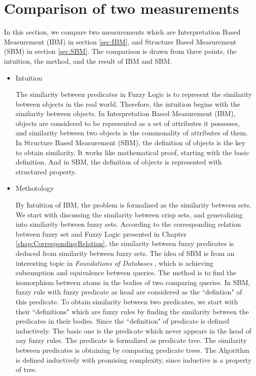 \section{Comparison of two measurements}
\label{sec:CompTwoMeasurements}
In this section, we compare two measurements which are Interpretation Based Measurement (IBM) in section \ref{sec:IBM}, and  Structure Based Measurement (SBM) in section \ref{sec:SBM}. The comparison is drawn from three points, the intuition, the method, and the result of IBM and SBM.

\begin{itemize}
\item Intuition 

The similarity between predicates in Fuzzy Logic is to represent the similarity between objects in the real world. Therefore, the intuition begins with  the similarity between objects. In Interpretation Based Measurement (IBM), objects are considered to be represented as a set of attributes it possesses, and similarity between two objects is the commonality of attributes of them. In Structure Based Measurement (SBM), the definition of objects is the key to obtain similarity. It works like mathematical proof, starting with the basic definition. And in SBM, the definition of objects  is represented with structured property.

\item Methotology

By Intuition of IBM, the problem is formalized as the similarity between sets. We start with discussing the similarity between crisp sets, and generalizing into similarity between fuzzy sets. According to the corresponding relation between fuzzy set and Fuzzy Logic presented in Chapter \ref{chap:CorrespondingRelation}, the similarity between fuzzy predicates is deduced from similarity between fuzzy sets. The idea of SBM is from an interesting topic in \textit{Foundations of Databases} \cite{AHV95}, which is achieving subsumption and equivalence between queries. The method is to find the isomorphism between atoms in the bodies of two comparing queries. In SBM, fuzzy rule with fuzzy predicate as head are considered as the ``defintion" of this predicate. To obtain similarity between two predicates, we start with their ``definitions" which are fuzzy rules by finding the similarity between the predicates in their bodies. Since the ``definition" of predicate is defined inductively. The basic one is the predicate which never appears in the head of any fuzzy rules. The predicate is formalized as predicate tree. The similarity between predicates is obtaining by comparing predicate trees. The Algorithm is defined inductively with promising complexity, since inductive is a property of tree.


\end{itemize}
